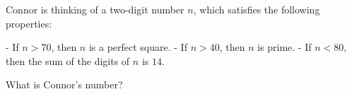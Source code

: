 Connor is thinking of a two-digit number $n$, which satisfies the following properties:

- If $n>70$, then $n$ is a perfect square.
- If $n>40$, then $n$ is prime.
- If $n<80$, then the sum of the digits of $n$ is $14$.

What is Connor's number?
